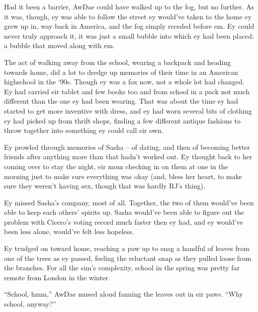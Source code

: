 Had it been a barrier, AwDae could have walked up to the fog, but no further. As it was, though, ey was able to follow the street ey would've taken to the home ey grew up in, way back in America, and the fog simply receded before em. Ey could never truly approach it, it was just a small bubble into which ey had been placed: a bubble that moved along with em.

The act of walking away from the school, wearing a backpack and heading towards home, did a lot to dredge up memories of their time in an American highschool in the `90s. Though ey was a fox now, not a whole lot had changed. Ey had carried eir tablet and few books too and from school in a pack not much different than the one ey had been wearing. That was about the time ey had started to get more inventive with dress, and ey had worn several bits of clothing ey had picked up from thrift shops, finding a few different antique fashions to throw together into something ey could call eir own.

Ey prowled through memories of Sasha -- of dating, and then of becoming better friends after anything more than that hadn't worked out. Ey thought back to her coming over to stay the night, eir mom checking in on them at one in the morning just to make sure everything was okay (and, bless her heart, to make sure they weren't having sex, though that was hardly RJ's thing).

Ey missed Sasha's company, most of all. Together, the two of them would've been able to keep each others' spirits up. Sasha would've been able to figure out the problem with Cicero's voting record much faster then ey had, and ey would've been less alone, would've felt less hopeless.

Ey trudged on toward home, reaching a paw up to snag a handful of leaves from one of the trees as ey passed, feeling the reluctant snap as they pulled loose from the branches. For all the sim's complexity, school in the spring was pretty far remote from London in the winter.

``School, hmm,'' AwDae mused aloud fanning the leaves out in eir paws. ``Why school, anyway?''

